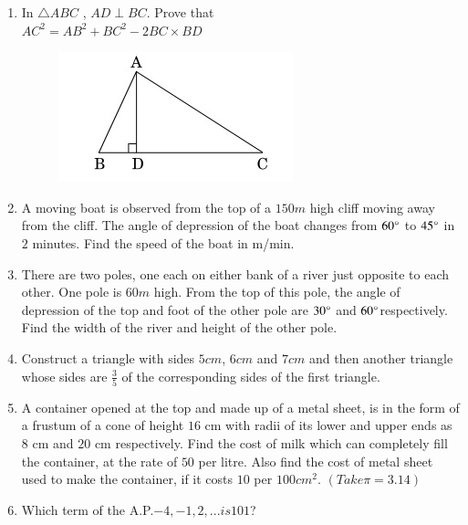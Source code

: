 \documentclass[12pt,-letter paper]{article}
\providecommand{\brak}[1]{\ensuremath{\left(#1\right)}}
\begin{document}
\begin{enumerate}
\item In $\triangle ABC$ , $AD \perp BC$. Prove that\\
$AC^2 = AB^2 + BC^2 - 2BC \times BD $
\begin{figure}[H]
    \centering
    \includegraphics[width=\columnwidth]{figs/img3.jpg	}
    \caption{}
    \label{fig:Fig_3}
\end{figure}
\item A moving boat is observed from the top of a $150m$ high cliff moving away from the cliff. The angle of depression of the boat changes from $60\degree$ to $45\degree$ in $2$ minutes. Find the speed of the boat in m/min.

\item There are two poles, one each on either bank of a river just opposite to each other. One pole is $60m$ high. From the top of this pole, the angle of depression of the top and foot of the other pole are $30\degree$ and $60\degree$respectively. Find the width of the river and height of the other pole.

\item Construct a triangle with sides $5cm$, $6cm$ and $7cm$ and then another triangle whose sides are $\frac{3}{5}$ of the corresponding sides of the first triangle.

\item A container opened at the top and made up of a metal sheet, is in the 
form of a frustum of a cone of height $16$ cm with radii of its lower and 
upper ends as $8$ cm and $20$ cm respectively. Find the cost of milk which 
can completely fill the container, at the rate of \rupee $50$ per litre. Also find the cost of metal sheet used to make the container, if it costs \rupee$ 10$ per $100 cm^2$. $\brak{Take\pi = 3.14}$

\item Which term of the A.P.$-4, - 1, 2, ... is 101$?


\end{enumerate}
\end{document}
